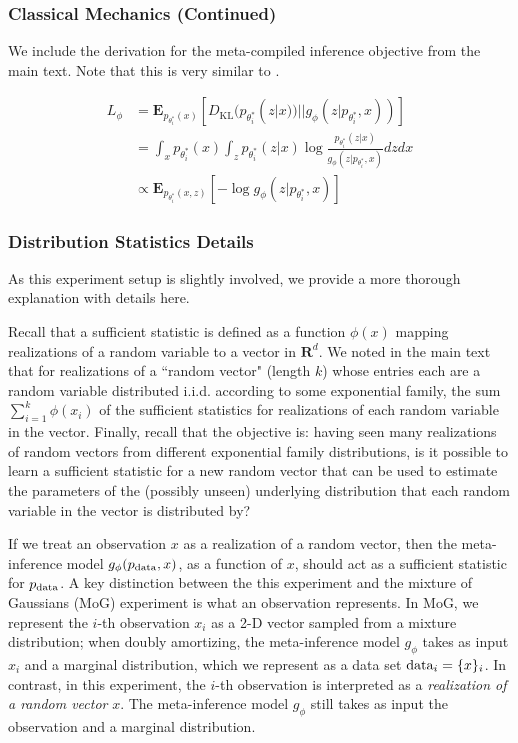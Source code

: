 \subsubsection{Classical Mechanics (Continued)}

We include the derivation for the meta-compiled inference objective from the main text. Note that this is very similar to \cite{le2016inference}.

\begin{align*}
    L_\phi &= \mathbf{E}_{p_{\theta_i^*}(x)}[D_{\text{KL}}(p_{\theta_i^*}(z|x)) || g_\phi(z|p_{\theta_i^*}, x))] \\
    &= \int_{x} p_{\theta_i^*}(x) \int_{z} p_{\theta_i^*}(z|x)\log \frac{p_{\theta_i^*}(z|x)}{g_\phi(z|p_{\theta_i^*}, x)} dz dx \\
    &\propto \mathbf{E}_{p_{\theta_i^*}(x, z)}[-\log g_\phi(z|p_{\theta_i^*}, x)]
\end{align*}

\subsubsection{Distribution Statistics Details}
As this experiment setup is slightly involved, we provide a more thorough explanation with details here. 

Recall that a sufficient statistic is defined as a function $\phi(x)$ mapping realizations of a random variable to a vector in $\mathbf{R}^d$. We noted in the main text that for realizations of a ``random vector" (length $k$) whose entries each are a random variable distributed i.i.d. according to some exponential family, the sum $\sum_{i=1}^k \phi(x_i)$ of the sufficient statistics for realizations of each random variable in the vector. Finally, recall that the objective is: having seen many realizations of random vectors from different exponential family distributions, is it possible to learn a sufficient statistic for a new random vector that can be used to estimate the parameters of the (possibly unseen) underlying distribution that each random variable in the vector is distributed by?

If we treat an observation $x$ as a realization of a random vector, then the meta-inference model $g_\phi(p_{\textup{data}}, x)$, as a function of $x$, should act as a sufficient statistic for $p_{\textup{data}}$. A key distinction between the this experiment and the mixture of Gaussians (MoG) experiment is what an observation represents. In MoG, we represent the $i$-th observation $x_i$ as a 2-D vector sampled from a mixture distribution; when doubly amortizing, the meta-inference model $g_\phi$ takes as input $x_i$ and a marginal distribution, which we represent as a data set $\textup{data}_i = \{ x \}_i$. In contrast, in this experiment, the $i$-th observation is interpreted as a \textit{realization of a random vector} $x$. The meta-inference model $g_\phi$ still takes as input the observation and a marginal distribution. 

